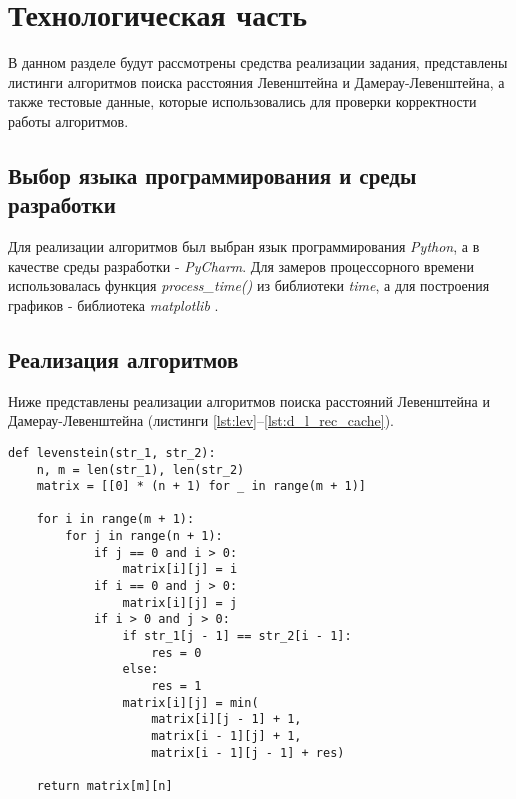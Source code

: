 \chapter{Технологическая часть}

В данном разделе будут рассмотрены средства реализации задания, представлены листинги алгоритмов поиска расстояния Левенштейна и Дамерау-Левенштейна, а также тестовые данные, которые использовались для проверки корректности работы алгоритмов.


\section{Выбор языка программирования и среды разработки}
Для реализации алгоритмов был выбран язык программирования \textit{Python}, а в качестве среды разработки - \textit{PyCharm}.
Для замеров процессорного времени использовалась функция \textit{process\_time()} \cite{time} из библиотеки \textit{time}, а для построения графиков - библиотека \textit{matplotlib} \cite{mpl}.


\section{Реализация алгоритмов}
Ниже представлены реализации алгоритмов поиска расстояний Левенштейна и Дамерау-Левенштейна (листинги \ref{lst:lev}--\ref{lst:d_l_rec_cache}).

\begin{center}
    \captionsetup{justification=raggedright,singlelinecheck=off}
    \begin{lstlisting}[label=lst:lev,caption=Итерационный алгоритм поиска расстояния Левенштейна]
def levenstein(str_1, str_2):
    n, m = len(str_1), len(str_2)
    matrix = [[0] * (n + 1) for _ in range(m + 1)]

    for i in range(m + 1):
        for j in range(n + 1):
            if j == 0 and i > 0:
                matrix[i][j] = i
            if i == 0 and j > 0:
                matrix[i][j] = j
            if i > 0 and j > 0:
                if str_1[j - 1] == str_2[i - 1]:
                    res = 0
                else:
                    res = 1
                matrix[i][j] = min(
                    matrix[i][j - 1] + 1,
                    matrix[i - 1][j] + 1,
                    matrix[i - 1][j - 1] + res)

    return matrix[m][n]
\end{lstlisting}
\end{center}


